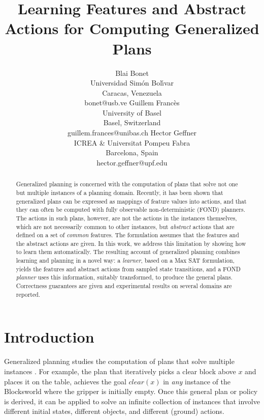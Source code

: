 \documentclass[letterpaper]{article} %
\title{Learning Features and Abstract Actions for Computing Generalized Plans}
\author{%
Blai Bonet\\ Universidad Sim\'on Bol\'{\i}var \\ Caracas, Venezuela \\ bonet@usb.ve
\And Guillem Franc\`{e}s \\ University of Basel \\ Basel, Switzerland \\ guillem.frances@unibas.ch
\And Hector Geffner \\ ICREA \& Universitat Pompeu Fabra \\ Barcelona, Spain \\ hector.geffner@upf.edu
}
\begin{document}
\maketitle

\begin{abstract}
  Generalized planning is concerned with the computation of plans that solve not one but  multiple instances
  of a planning domain. Recently, it has been shown that generalized plans can be expressed as mappings of feature
  values into actions, and that they can often be computed with fully observable non-deterministic
  (FOND) planners. %
  The actions in such plans, however, are not the actions in the instances themselves, which are
  not necessarily common to  other instances, but \emph{abstract} actions that are defined on a set
  of \emph{common} features. The formulation assumes that the features and the abstract
  actions are given.
  In this work, we address this limitation by showing how to learn them automatically.
  The resulting account of generalized planning combines learning and planning
  in a novel way: a \emph{learner}, based on a Max SAT formulation, yields the features and abstract
  actions from sampled state transitions, and a FOND \emph{planner}
  uses this information, suitably transformed, to produce the general plans.
  Correctness guarantees are given and experimental results on several domains are reported.
\end{abstract}


\section{Introduction}

Generalized planning studies the computation of plans  that   solve   multiple  instances
\cite{srivastava08learning,bonet:icaps2009,hu:generalized,BelleL16,anders:generalized}.
For example, the plan  that iteratively  picks  a  clear block above $x$
and places it  on the table, achieves the goal $clear(x)$
in \emph{any} instance of the Blocksworld where the gripper is initially empty.
Once this  general plan or  policy is derived, it can be  applied to solve an infinite collection
of instances that involve different initial states, different objects, and  different (ground)  actions.
\end{document}
